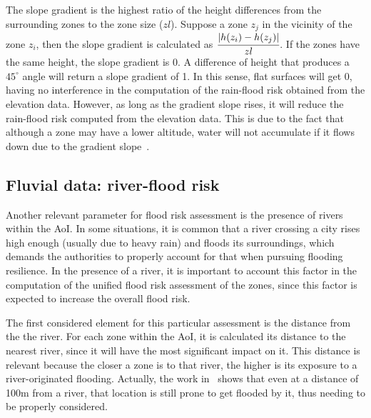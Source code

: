 \begin{refsection}
The slope gradient is the highest ratio of the height differences from the surrounding zones to the zone size ($zl$). Suppose a zone $z_j$ in the vicinity of the zone $z_i$, then the slope gradient is calculated as $\cfrac{|h(z_i) - h(z_j)|}{zl}$. If the zones have the same height, the slope gradient is 0. A difference of height that produces a $45^{\circ}$ angle will return a slope gradient of 1. In this sense, flat surfaces will get 0, having no interference in the computation of the rain-flood risk obtained from the elevation data. However, as long as the gradient slope rises, it will reduce the rain-flood risk computed from the elevation data. This is due to the fact that although a zone may have a lower altitude, water will not accumulate if it flows down due to the gradient slope~\cite{elevation1}.

\subsection{Fluvial data: river-flood risk}

Another relevant parameter for flood risk assessment is the presence of rivers within the AoI. In some situations, it is common that a river crossing a city rises high enough (usually due to heavy rain) and floods its surroundings, which demands the authorities to properly account for that when pursuing flooding resilience. In the presence of a river, it is important to account this factor in the computation of the unified flood risk assessment of the zones, since this factor is expected to increase the overall flood risk.

The first considered element for this particular assessment is the distance from the the river. For each zone within the AoI, it is calculated its distance to the nearest river, since it will have the most significant impact on it. This distance is relevant because the closer a zone is to that river, the higher is its exposure to a river-originated flooding. Actually, the work in~\cite{distance1} shows that even at a distance of 100m from a river, that location is still prone to get flooded by it, thus needing to be properly considered.


\end{refsection}
